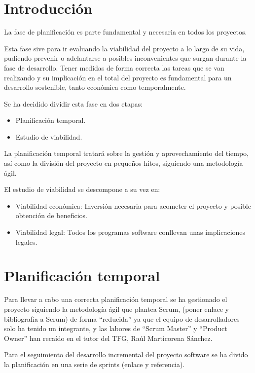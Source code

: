 
\section{Introducción}

La fase de planificación es parte fundamental y necesaria en todos los proyectos.

Esta fase sive para ir evaluando la viabilidad del proyecto a lo largo de su vida, pudiendo prevenir o adelantarse a posibles inconvenientes que surgan durante la fase de desarrollo.
Tener medidas de forma correcta las tareas que se van realizando y su implicación en el total del proyecto es fundamental para un desarrollo sostenible, tanto económica como temporalmente.

Se ha decidido dividir esta fase en dos etapas:

\begin{itemize}
	\item
	Planificación temporal.
	\item
	Estudio de viabilidad.
\end{itemize}

La planificación temporal tratará sobre la gestión y aprovechamiento del tiempo, así como la división del proyecto en pequeños hitos, siguiendo una metodología ágil.

El estudio de viabilidad se descompone a su vez en:

\begin{itemize}
	\item
	Viabilidad económica: Inversión necesaria para acometer el proyecto y posible obtención de beneficios.
	\item
	Viabilidad legal: Todos los programas software conllevan unas implicaciones legales.
\end{itemize}
\clearpage
\section{Planificación temporal}

Para llevar a cabo una correcta planificación temporal se ha gestionado el proyecto siguiendo la metodología ágil que plantea Scrum, (poner enlace y bibliografía a Scrum) de forma ``reducida'' ya que el equipo de desarrolladores solo ha tenido un integrante, y las labores de ``Scrum Master'' y ``Product Owner'' han recaído en el tutor del TFG, Raúl Marticorena Sánchez.

Para el seguimiento del desarrollo incremental del proyecto software se ha divido la planificación en una serie de sprints (enlace y referencia).

